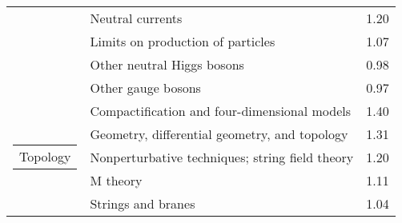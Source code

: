 \begin{longtable}[H]{p{}|p{}|p{}}
                                        & Neutral currents &  1.20 \\
                                        & Limits on production of particles &  1.07 \\
                                        & Other neutral Higgs bosons &  0.98 \\
                                        & Other gauge bosons &  0.97 \\
\cline{1-3}
\multirow{5}{*}{\begin{tabular}{l}Topology\end{tabular}} & Compactification and four-dimensional models &  1.40 \\
                                        & Geometry, differential geometry, and topology &  1.31 \\
                                        & Nonperturbative techniques; string field theory &  1.20 \\
                                        & M theory &  1.11 \\
                                        & Strings and branes &  1.04 \\
\end{longtable}
